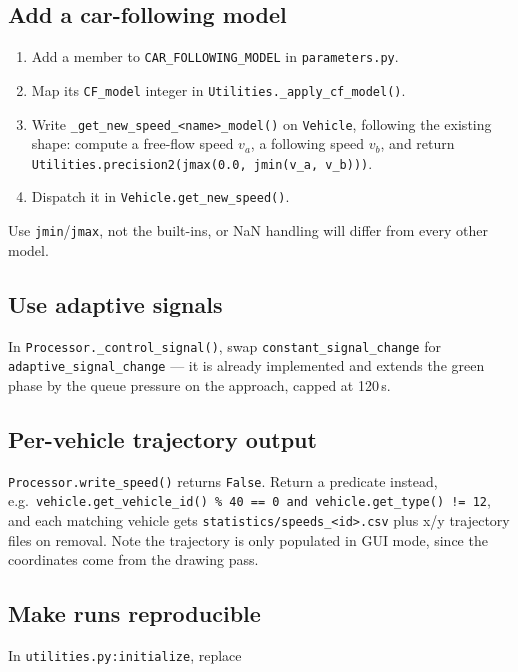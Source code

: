 \documentclass[11pt, a4paper]{article}
\newcommand{\code}[1]{\texttt{#1}}
\begin{document}
\subsection{Add a car-following model}

\begin{enumerate}
    \item Add a member to \code{CAR\_FOLLOWING\_MODEL} in \code{parameters.py}.
    \item Map its \code{CF\_model} integer in
          \code{Utilities.\_apply\_cf\_model()}.
    \item Write \code{\_get\_new\_speed\_<name>\_model()} on \code{Vehicle},
          following the existing shape: compute a free-flow speed $v_a$, a
          following speed $v_b$, and return
          \code{Utilities.precision2(jmax(0.0, jmin(v\_a, v\_b)))}.
    \item Dispatch it in \code{Vehicle.get\_new\_speed()}.
\end{enumerate}

Use \code{jmin}/\code{jmax}, not the built-ins, or NaN handling will differ from
every other model.

\subsection{Use adaptive signals}

In \code{Processor.\_control\_signal()}, swap \code{constant\_signal\_change} for
\code{adaptive\_signal\_change} --- it is already implemented and extends the
green phase by the queue pressure on the approach, capped at 120\,s.

\subsection{Per-vehicle trajectory output}

\code{Processor.write\_speed()} returns \code{False}. Return a predicate instead,
e.g.\ \code{vehicle.get\_vehicle\_id() \% 40 == 0 and vehicle.get\_type() != 12},
and each matching vehicle gets \code{statistics/speeds\_<id>.csv} plus x/y
trajectory files on removal. Note the trajectory is only populated in GUI mode,
since the coordinates come from the drawing pass.

\subsection{Make runs reproducible}

In \code{utilities.py:initialize}, replace
\end{document}
